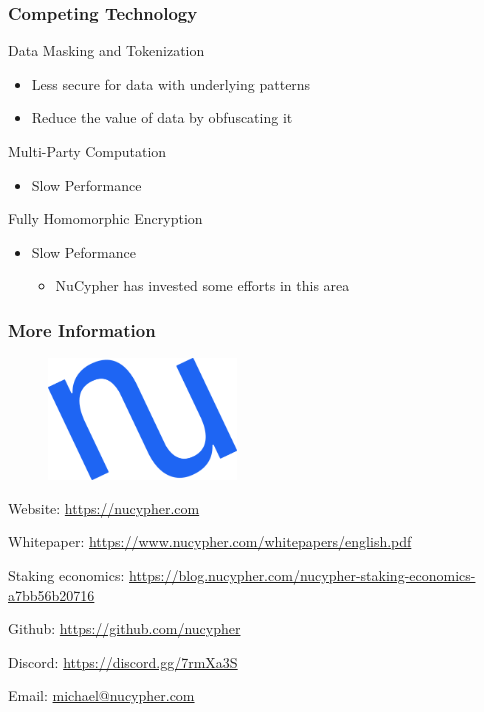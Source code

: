 \documentclass[xetex,mathsans,sans,aspectratio=169]{beamer}
\begin{document}
    \begin{frame}
      \frametitle{Competing Technology}
       Data Masking and Tokenization
       \begin{itemize}
           \item Less secure for data with underlying patterns
           \item Reduce the value of data by obfuscating it
       \end{itemize}

       Multi-Party Computation
       \begin{itemize}
           \item Slow Performance
       \end{itemize}

       Fully Homomorphic Encryption
       \begin{itemize}
           \item Slow Peformance
           \begin{itemize}
               \item NuCypher has invested some efforts in this area
           \end{itemize}
       \end{itemize}

     \end{frame}

    \begin{frame}
        \frametitle{More Information}
        \begin{figure}
            \centering
            \includegraphics[width=5cm]{pdf/nucypher_logo.pdf}
        \end{figure}
        Website: \url{https://nucypher.com}

        Whitepaper: \url{https://www.nucypher.com/whitepapers/english.pdf}

        Staking economics: \url{https://blog.nucypher.com/nucypher-staking-economics-a7bb56b20716}

        Github: \url{https://github.com/nucypher}

        Discord: \url{https://discord.gg/7rmXa3S}

        Email: \href{mailto:michael@nucypher.com}{michael@nucypher.com}
    \end{frame}
\end{document}
